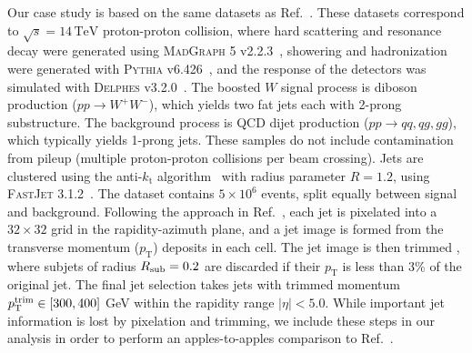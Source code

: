\documentclass[aps,prd,twocolumn,superscriptaddress,preprintnumbers,nofootinbib,longbibliography,floatfix]{revtex4-1}
\newcommand{\rref}[1]{Ref.~\cite{#1}}
\begin{document}
Our case study is based on the same datasets as \rref{Baldi:2016fql}. These datasets correspond to $\sqrt{s}=14\, \mbox{TeV}$ proton-proton collision, where hard scattering and resonance decay were generated using \textsc{MadGraph 5} v2.2.3~\cite{Alwall:2011uj}, showering and hadronization were generated with \textsc{Pythia} v6.426~\cite{Sjostrand:2006za}, and the response of the detectors was simulated with \textsc{Delphes} v3.2.0~\cite{deFavereau:2013fsa}. The boosted $W$ signal process is diboson production ($pp \to W^+ W^-$), which yields two fat jets each with 2-prong substructure. The background process is QCD dijet production ($pp \to qq, qg, gg$), which typically yields 1-prong jets. These samples do not include contamination from pileup (multiple proton-proton collisions per beam crossing). Jets are clustered using the anti-$k_{\textrm{t}}$ algorithm~\cite{Cacciari:2008gp} with radius parameter $R = 1.2$, using \textsc{FastJet 3.1.2}~\cite{Cacciari:2011ma}. The dataset contains $5 \times 10^{6}$ events, split equally between signal and background. Following the approach in \rref{Baldi:2016fql}, each jet is pixelated into a $32\times32$ grid in the rapidity-azimuth plane, and a jet image is formed from the transverse momentum ($p_{\textrm{T}}$) deposits in each cell. The jet image is then trimmed \cite{Krohn:2009th}, where subjets of radius $R_{\rm sub}=0.2$ are discarded if their $p_{\textrm{T}}$ is less than 3\% of the original jet. The final jet selection takes jets with trimmed momentum $p^{\rm trim}_{\textrm{T}} \in [300,400]$ GeV within the rapidity range $\left|\eta\right| < 5.0$. While important jet information is lost by pixelation and trimming, we include these steps in our analysis in order to perform an apples-to-apples comparison to \rref{Baldi:2016fql}.
\end{document}
